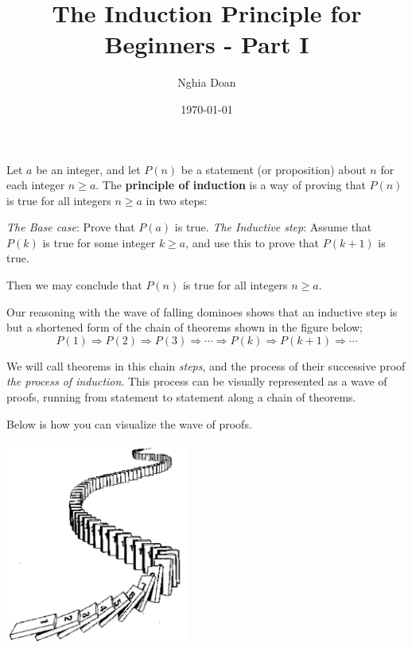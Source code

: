 \documentclass{article}
\title{The Induction Principle for Beginners - Part I}
\author{Nghia Doan}
\date{\today}
\begin{document}
\maketitle

\begin{definition*}
    \label{definition:induction-principle}
    Let $a$ be an integer, and let $P(n)$ be a statement (or proposition) about $n$ for each integer $n \ge a$.
    The \textbf{principle of induction} is a way of proving that $P(n)$ is true for all integers $n \ge a$ in two steps:
    \begin{enumerate}[topsep=0pt, partopsep=0pt, itemsep=0pt]
        \ii \textit{The Base case}: Prove that $P(a)$ is true.
        \ii \textit{The Inductive step}: Assume that $P(k)$ is true for some integer $k \ge a$,
        and use this to prove that $P(k+1)$ is true.
    \end{enumerate}
    Then we may conclude that $P(n)$ is true for all integers $n \ge a$.
\end{definition*}

Our reasoning with the wave of falling dominoes shows that an inductive step is but a shortened form of the chain of theorems
shown in the figure below;
\[
    P(1) \Rightarrow P(2) \Rightarrow P(3) \Rightarrow \cdots \Rightarrow P(k) \Rightarrow P(k+1) \Rightarrow \cdots
\]

We will call theorems in this chain \textit{steps}, and the process of their successive proof \textit{the process of induction}.
This process can be visually represented as a wave of proofs, running from statement to statement along a chain of theorems.

Below is how you can visualize the wave of proofs.

\begin{center}
    \includegraphics[width=6cm]{./png/cropped-cropped-domino1.png}
\end{center}
\end{document}
